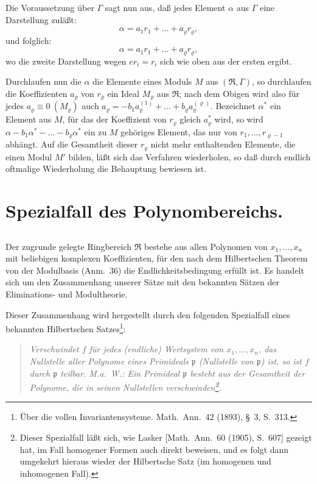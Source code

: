 \documentclass[fontsize=10pt,paper=a5,pagesize,headings=small]{scrbook}
\newcommand{\ideal}[1]{\mathfrak{#1}}
\newcommand{\ring}[1]{\mathfrak{#1}}
\theoremstyle{plain}
\begin{document}
Die Voraussetzung über $\varGamma$ sagt nun aus, daß jedes Element $\alpha$
aus $\varGamma$ eine Darstellung zuläßt:
\[ \alpha = a_1 r_1 + \dots + a_\varrho r_\varrho, \]
und folglich:
\[ \alpha = a_1 r_1 + \dots + a_\varrho r_\varrho, \]
wo die zweite Darstellung wegen $er_i = r_i$ sich wie oben aus der ersten ergibt.

Durchlaufen nun die $\alpha$ die Elemente eines Moduls $M$ aus
$(\ring{R}, \varGamma)$, so durchlaufen die Koeffizienten $a_\varrho$ von $r_\varrho$
ein Ideal $M_\varrho$ aus $\ring{R}$; nach dem Obigen wird also für jedes
$a_\varrho \equiv 0\ (M_\varrho)$ auch $a_\varrho = -b_1 a_\varrho^{(1)} + \dots + b_\varrho a_\varrho^{(\varrho)}$.
Bezeichnet $\alpha^*$ ein Element aus $M$, für das der Koeffizient von
$r_\varrho$ gleich $a_\varrho^*$ wird, so wird $\alpha - b_1\alpha^* - \dots - b_\varrho\alpha^*$
ein zu $M$ gehöriges Element, das nur von $r_1,\dots,r_{\varrho-1}$ abhängt.
Auf die Gesamtheit dieser $r_\varrho$ nicht mehr enthaltenden Elemente,
die einen Modul $M'$ bilden, läßt sich das Verfahren wiederholen,
so daß durch endlich oftmalige Wiederholung die Behauptung bewiesen ist.

\section{Spezialfall des Polynombereichs.}

\subsection{}

Der zugrunde gelegte Ringbereich $\ring{R}$ bestehe aus allen Polynomen
von $x_1,\dots,x_n$ mit beliebigen komplexen Koeffizienten, für den nach dem
Hilbertschen Theorem von der Modulbasis (Anm.~36) die Endlichkeitsbedingung
erfüllt ist. Es handelt sich um den Zusammenhang unserer Sätze mit den
bekannten Sätzen der Eliminations- und Modultheorie.

Dieser Zusammenhang wird hergestellt durch den folgenden Spezialfall
eines bekannten Hilbertschen Satzes\footnote{Über die vollen Invariantensysteme.
Math.\ Ann.\ 42 (1893), \S~3, S.~313.}:

\begin{quote}
\textit{Verschwindet $f$ für jedes (endliche) Wertsystem von $x_1,\dots,x_n$,
das Nullstelle aller Polynome eines Primideals $\ideal{p}$ (Nullstelle von
$\ideal{p}$) ist, so ist $f$ durch $\ideal{p}$ teilbar. M.a.~W.: Ein
Primideal $\ideal{p}$ besteht aus der Gesamtheit der Polynome, die in seinen
Nullstellen verschwinden\footnote{Dieser Spezialfall läßt sich, wie Lasker
[Math.\ Ann.\ 60 (1905), S.~607] gezeigt hat, im Fall homogener Formen auch
direkt beweisen, und es folgt dann umgekehrt hieraus wieder der Hilbertsche
Satz (im homogenen und inhomogenen Fall).}.}
\end{quote}
\end{document}
